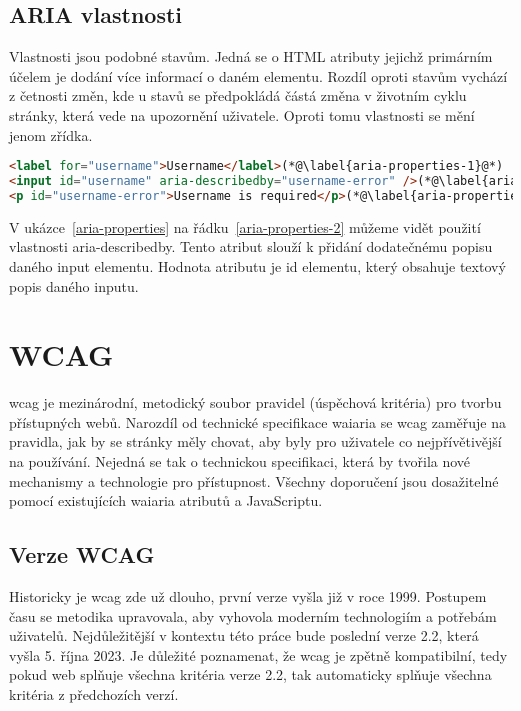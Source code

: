 \subsection{ARIA vlastnosti}

Vlastnosti jsou podobné stavům.
Jedná se o HTML atributy jejichž primárním účelem je dodání více informací o daném elementu.
Rozdíl oproti stavům vychází z četnosti změn, kde u stavů se předpokládá částá změna v životním cyklu stránky, která vede na upozornění uživatele.
Oproti tomu vlastnosti se mění jenom zřídka.

\begin{lstlisting}[caption={Aria vlastnosti}, label={aria-properties}, language=html]
<label for="username">Username</label>(*@\label{aria-properties-1}@*)
<input id="username" aria-describedby="username-error" />(*@\label{aria-properties-2}@*)
<p id="username-error">Username is required</p>(*@\label{aria-properties-3}@*)
\end{lstlisting}

V ukázce~\ref{aria-properties} na řádku~\ref{aria-properties-2} můžeme vidět použití vlastnosti aria-describedby.
Tento atribut slouží k přidání dodatečnému popisu daného input elementu. Hodnota atributu je id elementu, který obsahuje textový popis daného inputu.

\section{WCAG}

\gls{wcag} je mezinárodní, metodický soubor pravidel (úspěchová kritéria) pro tvorbu přístupných webů.
Narozdíl od technické specifikace \gls{waiaria} se \gls{wcag} zaměřuje na pravidla, jak by se stránky měly chovat, aby byly pro uživatele co nejpřívětivější na používání.
Nejedná se tak o technickou specifikaci, která by tvořila nové mechanismy a technologie pro přístupnost.
Všechny doporučení jsou dosažitelné pomocí existujících \gls{waiaria} atributů a JavaScriptu.

\subsection{Verze WCAG}

Historicky je \gls{wcag} zde už dlouho, první verze vyšla již v roce 1999.
Postupem času se metodika upravovala, aby vyhovola moderním technologiím a potřebám uživatelů.
Nejdůležitější v kontextu této práce bude poslední verze 2.2, která vyšla 5. října 2023.
Je důležité poznamenat, že \gls{wcag} je zpětně kompatibilní, tedy pokud web splňuje všechna kritéria verze 2.2, tak automaticky splňuje všechna kritéria z předchozích verzí.

